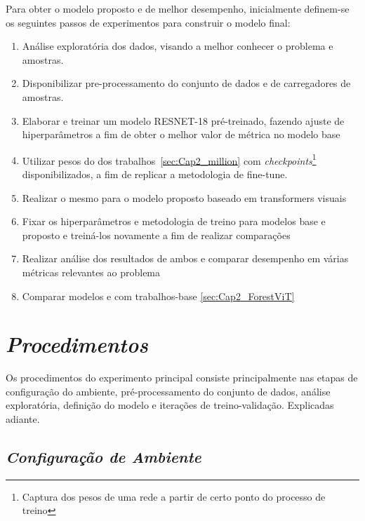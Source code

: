 Para obter o modelo proposto e de melhor desempenho, inicialmente definem-se os seguintes passos de experimentos para construir o modelo final:

\begin{enumerate}
\item   Análise exploratória dos dados, visando a melhor conhecer o problema e amostras. 
\item   Disponibilizar pre-processamento do conjunto de dados e de carregadores de amostras.
\item   Elaborar e treinar um modelo RESNET-18 pré-treinado, fazendo ajuste de hiperparâmetros a fim de obter o melhor valor de métrica no modelo base
\item   Utilizar pesos do dos trabalhos~\ref{sec:Cap2_million} com \textit{checkpoints}\footnote{Captura dos pesos de uma rede a partir de certo ponto do processo de treino} disponibilizados, a fim de replicar a metodologia de fine-tune. 
\item   Realizar o mesmo para o modelo proposto baseado em transformers visuais
\item   Fixar os hiperparâmetros e metodologia de treino para modelos base e proposto e treiná-los novamente a fim de realizar comparações
\item   Realizar análise dos resultados de ambos e comparar desempenho em várias métricas relevantes ao problema
\item   Comparar modelos e com trabalhos-base \ref{sec:Cap2_ForestViT} 
\end{enumerate}


    

\section{\textit{Procedimentos}}\label{sec:Cap3_Procedimentos}

Os procedimentos do experimento principal consiste principalmente nas etapas de configuração do ambiente, pré-processamento do conjunto de dados, análise exploratória, definição do modelo e iterações de treino-validação. Explicadas adiante.

\subsection{\textit{Configuração de Ambiente}}\label{sec:Cap3_ConfigAmbiente}

